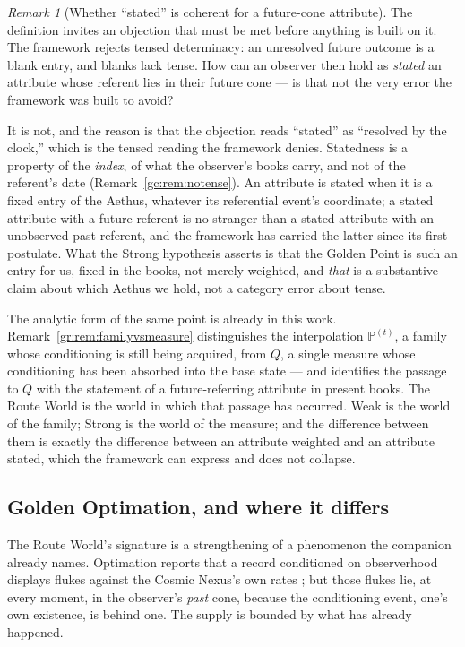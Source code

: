 \documentclass[11pt]{article}
\numberwithin{equation}{section}
\theoremstyle{plain}
\theoremstyle{definition}
\theoremstyle{remark}
\newtheorem{remark}[theorem]{Remark}
\newcommand{\PP}{\mathbb{P}}
\begin{document}
\begin{remark}[Whether ``stated'' is coherent for a future-cone
attribute]\label{gc:rem:statedcoherent}
The definition invites an objection that must be met before anything is
built on it. The framework rejects tensed determinacy: an unresolved
future outcome is a blank entry, and blanks lack tense. How can an
observer then hold as \emph{stated} an attribute whose referent lies in
their future cone --- is that not the very error the framework was built
to avoid?

It is not, and the reason is that the objection reads ``stated'' as
``resolved by the clock,'' which is the tensed reading the framework
denies. Statedness is a property of the \emph{index}, of what the
observer's books carry, and not of the referent's date
(Remark~\ref{gc:rem:notense}). An attribute is stated when it is a fixed entry
of the Aethus, whatever its referential event's coordinate; a stated
attribute with a future referent is no stranger than a stated attribute
with an unobserved past referent, and the framework has carried the
latter since its first postulate. What the Strong hypothesis asserts is
that the Golden Point is such an entry for us, fixed in the books,
not merely weighted, and \emph{that} is a substantive claim about
which Aethus we hold, not a category error about tense.

The analytic form of the same point is already in this work.
Remark~\ref{gr:rem:familyvsmeasure} distinguishes the interpolation
$\PP^{(t)}$, a family whose conditioning is still being acquired, from
$Q$, a single measure whose conditioning has been absorbed into the base
state --- and identifies the passage to $Q$ with the statement of a
future-referring attribute in present books. The Route World is the
world in which that passage has occurred. Weak is the world of the
family; Strong is the world of the measure; and the difference between
them is exactly the difference between an attribute weighted and an
attribute stated, which the framework can express and does not collapse.
\end{remark}

\subsection{Golden Optimation, and where it differs}\label{gc:sub:goldenopt}

The Route World's
signature is a strengthening of a phenomenon the companion already
names. Optimation reports that a record conditioned on observerhood
displays flukes against the Cosmic Nexus's own rates \cite{Nexus}; but
those flukes lie, at every moment, in the observer's \emph{past} cone,
because the conditioning event, one's own existence, is behind one.
The supply is bounded by what has already happened.
\end{document}
